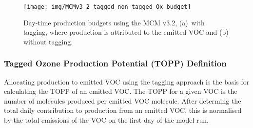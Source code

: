 \begin{figure}
    \centering
    \texttt{[image: img/MCMv3\_2\_tagged\_non\_tagged\_Ox\_budget]}
    \vspace{1mm}
    \caption{Day-time  production budgets using the MCM v3.2, \mbox{(a) with} tagging, where  production is attributed to the emitted VOC and (b) without tagging.}
    \vspace{-4mm}
    \label{f:Ox_budget}
\end{figure} 

\subsubsection{Tagged Ozone Production Potential (TOPP) Definition} %

Allocating  production to emitted VOC using the tagging approach is the basis for calculating the TOPP of an emitted VOC.
The TOPP for a given VOC is the number of  molecules produced per emitted VOC molecule.  
After determing the total daily contribution to  production from an emitted VOC, this is normalised by the total emissions of the VOC on the first day of the model run.
